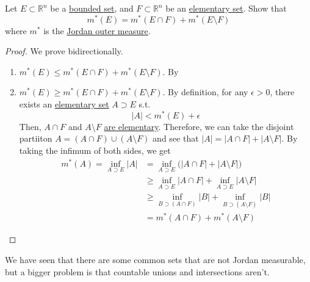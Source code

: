   \begin{theorem}
    \label{thm:caratheodory-property}
    Let $E \subset \mathbb{R}^n$ be a \hyperref[pst-def:bounded-set]{bounded set}, and $F \subset \mathbb{R}^n$ be an \hyperref[def:elementary-set]{elementary set}. Show that 
    \begin{equation}
      m^\ast (E) = m^\ast (E \cap F) + m^\ast(E \setminus F)
    \end{equation}
    where $m^\ast$ is the \hyperref[def:jordan-outer-inner-measure]{Jordan outer measure}. 
  \end{theorem}
  \begin{proof}
		We prove bidirectionally. 
		\begin{enumerate}
			\item $m^\ast (E) \leq m^\ast (E \cap F) + m^\ast(E \setminus F)$. By 
		  \item $m^\ast (E) \geq m^\ast (E \cap F) + m^\ast(E \setminus F)$. By definition, for any $\epsilon > 0$, there exists an \hyperref[def:elementary-set]{elementary set} $A \supset E$ s.t. 
				\begin{equation}
				  |A| < m^\ast (E) + \epsilon
				\end{equation}
				Then, $A \cap F$ and $A \setminus F$ \hyperref[thm:set_prop_elementary_sets]{are elementary}. Therefore, we can take the disjoint partiiton $A = (A \cap F) \cup (A \setminus F)$ and see that $|A| = |A \cap F| + |A \setminus F|$. By taking the infimum of both sides, we get 
				\begin{align}
					m^\ast (A) = \inf_{A \supset E} |A| 
						& = \inf_{A \supset E} \big( |A \cap F| + |A \setminus F| \big) \\ 
						& \geq \inf_{A \supset E} |A \cap F| + \inf_{A \supset E} |A \setminus F| \\ 
						& \geq \inf_{B \supset (A \cap F)} |B| + \inf_{B \supset (A \setminus F)} |B| \\ 
						& = m^\ast (A \cap F) + m^\ast (A \setminus F)
				\end{align}
		\end{enumerate}
  \end{proof}

  We have seen that there are some common sets that are not Jordan measurable, but a bigger problem is that countable unions and intersections aren't. 

